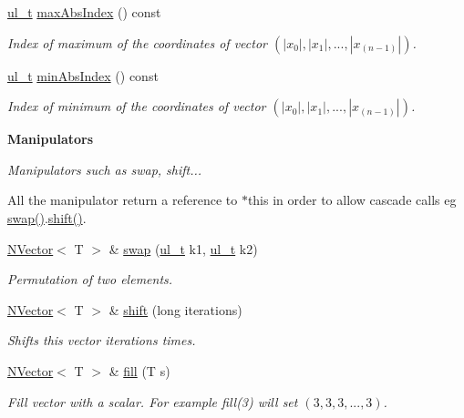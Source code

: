 \begin{Indent}
\begin{DoxyCompactItemize}
\mbox{\hyperlink{group___n_algebra_ga1b140a2034db3f5dfe18a987745df43a}{ul\+\_\+t}} \mbox{\hyperlink{class_n_vector_ac7d7d39b68956da9018684a3706a70c2}{max\+Abs\+Index}} () const
\begin{DoxyCompactList}\small\item\em Index of maximum of the coordinates of vector $ (|x_0|, |x_1|, ..., |x_{(n-1)}|) $. \end{DoxyCompactList}\item 
\mbox{\hyperlink{group___n_algebra_ga1b140a2034db3f5dfe18a987745df43a}{ul\+\_\+t}} \mbox{\hyperlink{class_n_vector_a8b9147431ee1f9c5a25c6e0b2f793c40}{min\+Abs\+Index}} () const
\begin{DoxyCompactList}\small\item\em Index of minimum of the coordinates of vector $ (|x_0|, |x_1|, ..., |x_{(n-1)}|) $. \end{DoxyCompactList}\end{DoxyCompactItemize}
\end{Indent}
\begin{Indent}\textbf{ Manipulators}\par
{\em Manipulators such as swap, shift...

All the manipulator return a reference to {\ttfamily $\ast$this} in order to allow cascade calls eg {\ttfamily \mbox{\hyperlink{class_n_vector_a8ea2e2cffa2c3053d835d05a571dac88}{swap()}}.\mbox{\hyperlink{class_n_vector_aabe8585ef2659ce3fa7872c2b96e3b20}{shift()}}}. }\begin{DoxyCompactItemize}
\item 
\mbox{\hyperlink{class_n_vector}{N\+Vector}}$<$ T $>$ \& \mbox{\hyperlink{class_n_vector_a8ea2e2cffa2c3053d835d05a571dac88}{swap}} (\mbox{\hyperlink{group___n_algebra_ga1b140a2034db3f5dfe18a987745df43a}{ul\+\_\+t}} k1, \mbox{\hyperlink{group___n_algebra_ga1b140a2034db3f5dfe18a987745df43a}{ul\+\_\+t}} k2)
\begin{DoxyCompactList}\small\item\em Permutation of two elements. \end{DoxyCompactList}\item 
\mbox{\hyperlink{class_n_vector}{N\+Vector}}$<$ T $>$ \& \mbox{\hyperlink{class_n_vector_aabe8585ef2659ce3fa7872c2b96e3b20}{shift}} (long iterations)
\begin{DoxyCompactList}\small\item\em Shifts {\ttfamily this} vector {\ttfamily iterations} times. \end{DoxyCompactList}\item 
\mbox{\hyperlink{class_n_vector}{N\+Vector}}$<$ T $>$ \& \mbox{\hyperlink{class_n_vector_ae0e51edea3a6e998c5b6ff5336939e90}{fill}} (T s)
\begin{DoxyCompactList}\small\item\em Fill vector with a scalar. For example {\ttfamily fill(3)} will set $ (3, 3, 3, ..., 3) $. \end{DoxyCompactList}\end{DoxyCompactItemize}
\end{Indent}
